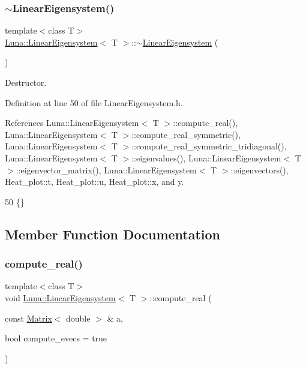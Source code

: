 \subsubsection{\texorpdfstring{$\sim$\+Linear\+Eigensystem()}{~LinearEigensystem()}}
{\footnotesize\ttfamily template$<$class T$>$ \\
\hyperlink{classLuna_1_1LinearEigensystem}{Luna\+::\+Linear\+Eigensystem}$<$ T $>$\+::$\sim$\hyperlink{classLuna_1_1LinearEigensystem}{Linear\+Eigensystem} (\begin{DoxyParamCaption}{ }\end{DoxyParamCaption})\hspace{0.3cm}{\ttfamily [inline]}}



Destructor. 



Definition at line 50 of file Linear\+Eigensystem.\+h.



References Luna\+::\+Linear\+Eigensystem$<$ T $>$\+::compute\+\_\+real(), Luna\+::\+Linear\+Eigensystem$<$ T $>$\+::compute\+\_\+real\+\_\+symmetric(), Luna\+::\+Linear\+Eigensystem$<$ T $>$\+::compute\+\_\+real\+\_\+symmetric\+\_\+tridiagonal(), Luna\+::\+Linear\+Eigensystem$<$ T $>$\+::eigenvalues(), Luna\+::\+Linear\+Eigensystem$<$ T $>$\+::eigenvector\+\_\+matrix(), Luna\+::\+Linear\+Eigensystem$<$ T $>$\+::eigenvectors(), Heat\+\_\+plot\+::t, Heat\+\_\+plot\+::u, Heat\+\_\+plot\+::x, and y.


\begin{DoxyCode}
50 \{\}
\end{DoxyCode}


\subsection{Member Function Documentation}
\mbox{\label{classLuna_1_1LinearEigensystem_ab303a80cc2cf6bfe232b9d62efe13109}} 
\subsubsection{\texorpdfstring{compute\+\_\+real()}{compute\_real()}\hspace{0.1cm}{\footnotesize\ttfamily [1/2]}}
{\footnotesize\ttfamily template$<$class T$>$ \\
void \hyperlink{classLuna_1_1LinearEigensystem}{Luna\+::\+Linear\+Eigensystem}$<$ T $>$\+::compute\+\_\+real (\begin{DoxyParamCaption}\item[{const \hyperlink{classLuna_1_1Matrix}{Matrix}$<$ double $>$ \&}]{a,  }\item[{bool}]{compute\+\_\+evecs = {\ttfamily true} }\end{DoxyParamCaption})}



